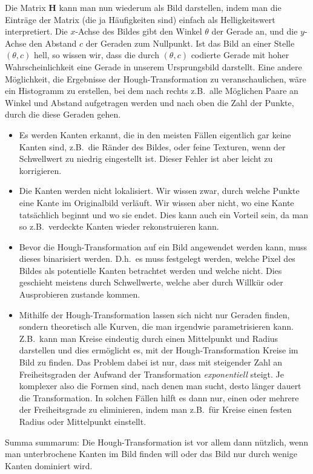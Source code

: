 Die Matrix $ \mathbf{H} $ kann man nun wiederum als Bild darstellen, indem man die Einträge der
Matrix (die ja Häufigkeiten sind) einfach als Helligkeitswert interpretiert. Die $ x $-Achse des
Bildes gibt den Winkel $ \theta $ der Gerade an, und die $ y $-Achse den Abstand $ c $ der Geraden 
zum Nullpunkt. Ist das Bild an einer Stelle $ (\theta, c) $ hell, so wissen wir, dass die durch
$ (\theta, c) $ codierte Gerade mit hoher Wahrscheinlichkeit eine Gerade in unserem Ursprungsbild
darstellt. Eine andere Möglichkeit, die Ergebnisse der Hough-Transformation zu veranschaulichen,
wäre ein Histogramm zu erstellen, bei dem nach rechts z.B.\ alle Möglichen Paare an Winkel und
Abstand aufgetragen werden und nach oben die Zahl der Punkte, durch die diese Geraden gehen.

\begin{remark} \leavevmode
\begin{itemize}
\item Es werden Kanten erkannt, die in den meisten Fällen eigentlich gar keine Kanten sind, z.B.\ 
  die Ränder des Bildes, oder feine Texturen, wenn der Schwellwert zu niedrig eingestellt ist. 
  Dieser Fehler ist aber leicht zu korrigieren.
\item Die Kanten werden nicht lokalisiert. Wir wissen zwar, durch welche Punkte eine Kante im
  Originalbild verläuft. Wir wissen aber nicht, wo eine Kante tatsächlich beginnt und wo sie endet.
  Dies kann auch ein Vorteil sein, da man so z.B.\ verdeckte Kanten wieder rekonstruieren kann.
\item Bevor die Hough-Transformation auf ein Bild angewendet werden kann, muss dieses binarisiert
  werden. D.h.\ es muss festgelegt werden, welche Pixel des Bildes als potentielle Kanten
  betrachtet werden und welche nicht. Dies geschieht meistens durch Schwellwerte, welche aber durch
  Willkür oder Ausprobieren zustande kommen.
\item Mithilfe der Hough-Transformation lassen sich nicht nur Geraden finden, sondern theoretisch
  alle Kurven, die man irgendwie parametrisieren kann. Z.B.\ kann man Kreise eindeutig durch
  einen Mittelpunkt und Radius darstellen und dies ermöglicht es, mit der Hough-Transformation 
  Kreise im Bild zu finden. Das Problem dabei ist nur, dass mit steigender Zahl an Freiheitsgraden 
  der Aufwand der Transformation \emph{exponentiell} steigt. Je komplexer also die Formen sind,
  nach denen man sucht, desto länger dauert die Transformation. In solchen Fällen hilft es dann nur,
  einen oder mehrere der Freiheitsgrade zu eliminieren, indem man z.B.\ für Kreise einen festen
  Radius oder Mittelpunkt einstellt.
\end{itemize}
Summa summarum: Die Hough-Transformation ist vor allem dann nützlich, wenn man unterbrochene
Kanten im Bild finden will oder das Bild nur durch wenige Kanten dominiert wird.
\end{remark}


